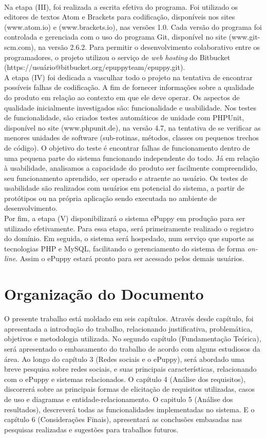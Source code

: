 \\
\indent
Na etapa (III), foi realizada a escrita efetiva do programa. Foi utilizado os editores de textos Atom e Brackets para codificação, disponíveis nos sites (www.atom.io) e (www.brackets.io), nas versões 1.0. Cada versão do programa foi controlada e gerenciada com o uso do programa Git, disponível no site (www.git-scm.com), na versão 2.6.2. Para permitir o desenvolvimento colaborativo entre os programadores, o projeto utilizou o serviço de {\it web hosting} do Bitbucket (https://usuário@bitbucket.org/epuppyteam/epuppy.git).
\\
\indent
A etapa (IV) foi dedicada a vasculhar todo o projeto na tentativa de encontrar possíveis falhas de codificação. A fim de fornecer informações sobre a qualidade do produto em relação ao contexto em que ele deve operar. Os aspectos de qualidade inicialmente investigados são: funcionalidade e usabilidade. Nos testes de funcionalidade, são criados testes automáticos de unidade com PHPUnit, disponível no site (www.phpunit.de), na versão 4.7, na tentativa de se verificar as menores unidades de software (sub-rotinas, métodos, classes ou pequenos trechos de código). O objetivo do teste é encontrar falhas de funcionamento dentro de uma pequena parte do sistema funcionando independente do todo. Já em relação à usabilidade, analisamos a capacidade do produto ser facilmente compreendido, seu funcionamento aprendido, ser operado e atraente ao usuário. Os testes de usabilidade são realizados com usuários em potencial do sistema, a partir de protótipos ou na própria aplicação sendo executada no ambiente de desenvolvimento.
\\
\indent
Por fim, a etapa (V) disponibilizará o sistema ePuppy em produção para ser utilizado efetivamente. Para essa etapa, será primeiramente realizado o registro do domínio. Em seguida, o sistema será hospedado, num serviço que suporte as tecnologias PHP e MySQL, facilitando o gerenciamento do sistema de forma {\it on-line}. Assim o ePuppy estará pronto para ser acessado pelos demais usuários.


\section{Organização do Documento}

O presente trabalho está moldado em seis capítulos. Através desde capítulo, foi apresentada a introdução do trabalho, relacionando justificativa, problemática, objetivos e metodologia utilizada. No segundo capítulo (Fundamentação Teórica), será apresentado o embasamento do trabalho de acordo com alguns estudiosos da área. Ao longo do capítulo 3 (Redes sociais e o ePuppy), será abordado uma breve pesquisa sobre redes sociais, e suas principais características, relacionando com o ePuppy e sistemas relacionados. O capítulo 4 (Análise dos requisitos), discorrerá sobre as principais formas de elicitação de requisitos utilizadas, casos de uso e diagramas e entidade-relacionamento. O capitulo 5 (Análise dos resultados), descreverá todas as funcionalidades implementadas no sistema. E o capítulo 6 (Considerações Finais), apresentará as conclusões embasadas nas pesquisas realizadas e sugestões para trabalhos futuros.



\nocite{Nascimento2014}
\nocite{Aguilar2015}
\nocite{Anaya2015}
\nocite{Arias2015}
\nocite{G12015}
\nocite{Gazzana2015}
\nocite{Veja2015}
